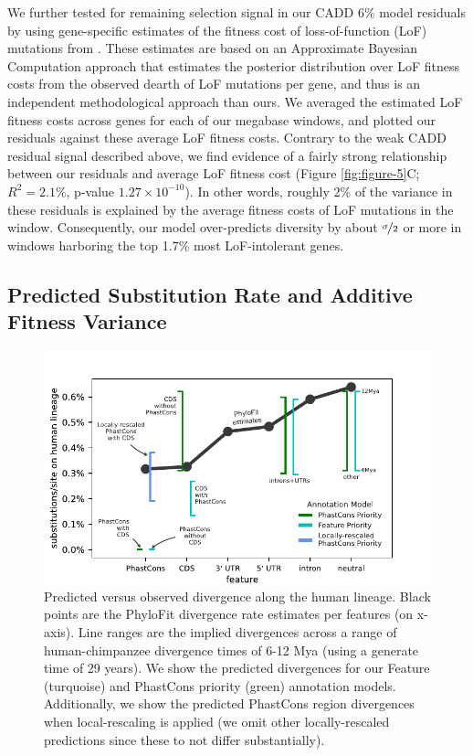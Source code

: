 \documentclass[11pt]{article}
\begin{document}
We further tested for remaining selection signal in our CADD 6\% model
residuals by using gene-specific estimates of the fitness cost of
loss-of-function (LoF) mutations from \textcite{Agarwal2023-un}. These
estimates are based on an Approximate Bayesian Computation approach that
estimates the posterior distribution over LoF fitness costs from the observed
dearth of LoF mutations per gene, and thus is an independent methodological
approach than ours. We averaged the estimated LoF fitness costs across genes
for each of our megabase windows, and plotted our residuals against these
average LoF fitness costs. Contrary to the weak CADD residual signal described
above, we find evidence of a fairly strong relationship between our residuals
and average LoF fitness cost (Figure \ref{fig:figure-5}C; $R^2 = 2.1\%$,
p-value $1.27 \times 10^{-10}$). In other words, roughly 2\% of the variance in
these residuals is explained by the average fitness costs of LoF mutations in
the window. Consequently, our model over-predicts diversity by about
$\nicefrac{\sigma}{2}$ or more in windows harboring the top 1.7\% most
LoF-intolerant genes.

\subsection*{Predicted Substitution Rate and Additive Fitness Variance}

\begin{figure}[htbp] \centering
    \includegraphics[width=\textwidth]{figures/figure_7_mod.pdf} 

    \caption{Predicted versus observed divergence along the human lineage.
        Black points are the PhyloFit divergence rate estimates per features
        (on x-axis). Line ranges are the implied divergences across a range of
        human-chimpanzee divergence times of 6-12 Mya (using a generate time of
        29 years). We show the predicted divergences for our Feature
        (turquoise) and PhastCons priority (green) annotation models.
        Additionally, we show the predicted PhastCons region divergences when
    local-rescaling is applied (we omit other locally-rescaled predictions
since these to not differ substantially).}

  \label{fig:figure-7}
\end{figure}
\end{document}
